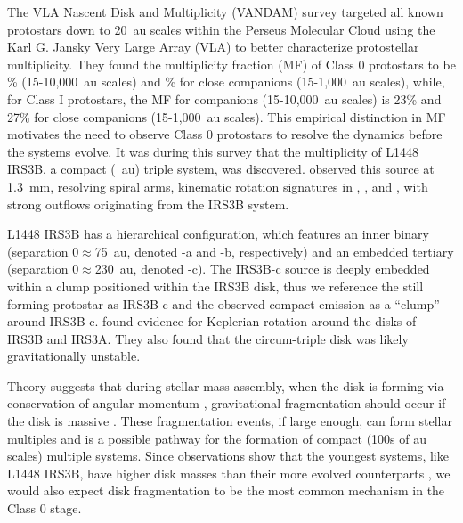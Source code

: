 \documentclass[twocolumn, 12pt, trackchanges]{aastex63}
\begin{document}
The VLA Nascent Disk and Multiplicity (VANDAM) survey \citep{2016ApJ...818...73T} targeted all known protostars down to 20~au scales within the Perseus Molecular Cloud using the Karl G. Jansky Very Large Array (VLA) to better characterize protostellar multiplicity. They found the multiplicity fraction (MF) of Class 0 protostars to be \% (15-10,000~au scales) and \% for close companions (15-1,000~au scales), while, for Class I protostars, the MF for companions (15-10,000~au scales) is 23\% and 27\% for close companions (15-1,000~au scales). This empirical distinction in MF motivates the need to observe Class 0 protostars to resolve the dynamics before the systems evolve. It was during this survey that the multiplicity of L1448 IRS3B, a compact (~au) triple system, was discovered. \citet{2016Natur.538..483T} observed this source at 1.3~mm, resolving spiral arms, kinematic rotation signatures in \ceo, \tco, and \htco, with strong outflows originating from the IRS3B system. 

L1448 IRS3B has a hierarchical configuration, which features an inner binary (separation 0$\approx$75~au, denoted -a and -b, respectively) and an embedded tertiary (separation 0$\approx$230~au, denoted -c). The IRS3B-c source is deeply embedded within a clump positioned within the IRS3B disk, thus we reference the still forming protostar as IRS3B-c and the observed compact emission as a ``clump'' around IRS3B-c. \citet{2016ApJ...818...73T}\space found evidence for Keplerian rotation around the disks of IRS3B and IRS3A. They also found that the circum-triple disk was likely gravitationally unstable.

Theory suggests that during stellar mass assembly, when the disk is forming via conservation of angular momentum \citep{1976ApJ...210..377U, 1984ApJ...286..529T, 2014prpl.conf..173L}, gravitational fragmentation should occur if the disk is massive \citep{1989ApJ...347..959A, 1999ApJ...525..330Y, 2010ApJ...710.1375K}. These fragmentation events, if large enough, can form stellar multiples and is a possible pathway for the formation of compact (\ab100s of au scales) multiple systems. Since observations show that the youngest systems, like L1448 IRS3B, have higher disk masses than their more evolved counterparts \citep{2020ApJ...890..130T}, we would also expect disk fragmentation to be the most common mechanism in the Class 0 stage.
\end{document}
